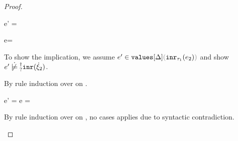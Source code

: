 \begin{proof}
\begin{byCases}
\begin{byCases}
\begin{byCases}
\begin{byCases}
                \item[\text{(\ref{rule:IVInl})}]
                  \begin{pfsteps}
                  \item e' =  
                  \item {} 
                  \end{pfsteps}

              \end{byCases}

            \item[\text{(\ref{rule:VInr}, \ref{rule:TInr})}]
              \begin{pfsteps}
              \item e= 
              \item {}  
              \item {}  
              \item {}  
              \end{pfsteps}
              To show the implication, we assume $\inValues{e'}{\Delta}{\hinr{\tau_1}{e_2}}$ and show $\cnotsatisfyormay{e'}{\cinr{\hxi_2}}$.
              \begin{pfsteps}
              \item {}  
              \end{pfsteps}
              By rule induction over  on .
              \begin{byCases}
                \item[\text{(\ref{rule:IVVal})}]
                \begin{pfsteps}
                \item e' = e =  
                \item {} 
                \end{pfsteps}

                \item[\text{(\ref{rule:IVIndet})}]
                  \begin{pfsteps}
                  \item {}  
                  \end{pfsteps}
                  By rule induction over  on
                  , no cases applies due to syntactic contradiction.


\end{byCases}
\end{byCases}
\end{byCases}
\end{byCases}
\end{proof}
